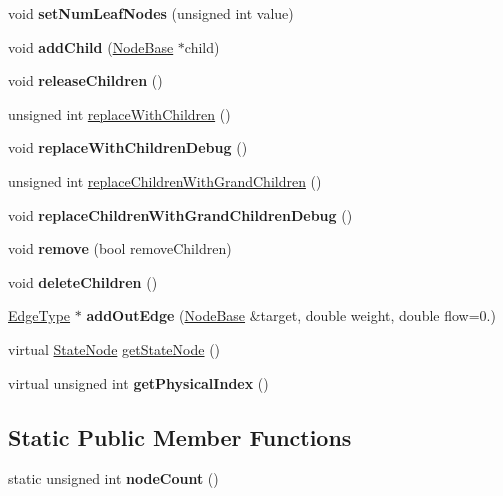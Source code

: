 \begin{DoxyCompactItemize}
void {\bfseries set\+Num\+Leaf\+Nodes} (unsigned int value)
\item 
\mbox{\label{classNodeBase_a46c08850619030b397e9c81c7efa06a8}} 
void {\bfseries add\+Child} (\mbox{\hyperlink{classNodeBase}{Node\+Base}} $\ast$child)
\item 
\mbox{\label{classNodeBase_a3101514bf8bfa9f3ff7c140c4164425a}} 
void {\bfseries release\+Children} ()
\item 
unsigned int \mbox{\hyperlink{classNodeBase_a8500451b00095013400f709cd4a333db}{replace\+With\+Children}} ()
\item 
\mbox{\label{classNodeBase_a1ea685b82f82e5574b9856b188ee02c0}} 
void {\bfseries replace\+With\+Children\+Debug} ()
\item 
unsigned int \mbox{\hyperlink{classNodeBase_a073a2bf2610b25e89b0f56a075c38a21}{replace\+Children\+With\+Grand\+Children}} ()
\item 
\mbox{\label{classNodeBase_a68597cb6ed37d76728ada66e4125664e}} 
void {\bfseries replace\+Children\+With\+Grand\+Children\+Debug} ()
\item 
\mbox{\label{classNodeBase_aee6a9c39ed4aea871de395d1d28be406}} 
void {\bfseries remove} (bool remove\+Children)
\item 
\mbox{\label{classNodeBase_a2c304f9fb58094c5a95e81a909cdaac8}} 
void {\bfseries delete\+Children} ()
\item 
\mbox{\label{classNodeBase_a33aaf137099d390267623dc5ad34391d}} 
\mbox{\hyperlink{classEdge}{Edge\+Type}} $\ast$ {\bfseries add\+Out\+Edge} (\mbox{\hyperlink{classNodeBase}{Node\+Base}} \&target, double weight, double flow=0.)
\item 
virtual \mbox{\hyperlink{structStateNode}{State\+Node}} \mbox{\hyperlink{classNodeBase_a1ea5960eead0b46f37108713eb8f2200}{get\+State\+Node}} ()
\item 
\mbox{\label{classNodeBase_a3b22624a8a072f7235937529e78fe054}} 
virtual unsigned int {\bfseries get\+Physical\+Index} ()
\end{DoxyCompactItemize}
\subsection*{Static Public Member Functions}
\begin{DoxyCompactItemize}
\item 
\mbox{\label{classNodeBase_ad7f60e0e8906742cd9e626834b9c0ec9}} 
static unsigned int {\bfseries node\+Count} ()
\end{DoxyCompactItemize}
